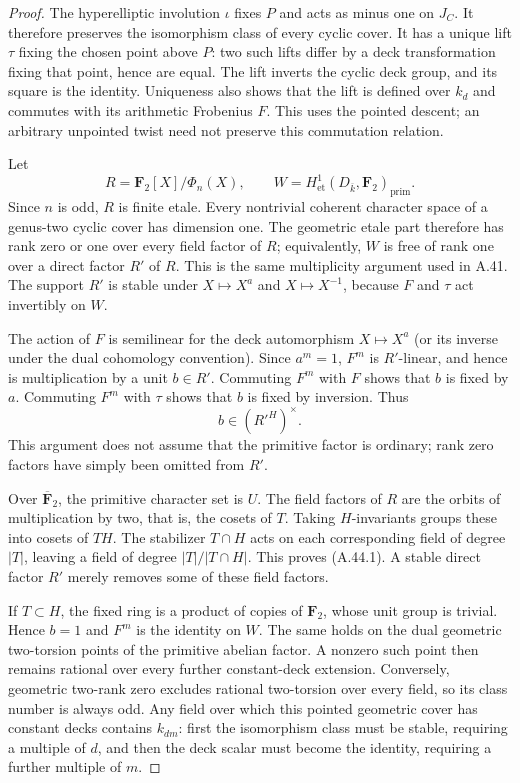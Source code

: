 \documentclass[11pt]{article}
\begin{document}
\begin{proof}
The hyperelliptic involution $\iota$ fixes $P$ and acts
as minus one on $J_C$. It therefore preserves the
isomorphism class of every cyclic cover. It has a
unique lift $\tau$ fixing the chosen point above $P$:
two such lifts differ by a deck transformation fixing
that point, hence are equal. The lift inverts the
cyclic deck group, and its square is the identity.
Uniqueness also shows that the lift is defined over
$k_d$ and commutes with its arithmetic Frobenius $F$.
This uses the pointed descent; an arbitrary unpointed
twist need not preserve this commutation relation.

Let
\[
 R=\mathbf F_2[X]/\Phi_n(X),\qquad
 W=H^1_{\mathrm{et}}(D_{\overline k},\mathbf F_2)_{\mathrm{prim}}.
\]
Since $n$ is odd, $R$ is finite etale. Every nontrivial
coherent character space of a genus-two cyclic cover
has dimension one. The geometric etale part therefore
has rank zero or one over every field factor of $R$;
equivalently, $W$ is free of rank one over a direct
factor $R'$ of $R$. This is the same multiplicity
argument used in A.41. The support $R'$ is stable
under $X\mapsto X^a$ and $X\mapsto X^{-1}$, because
$F$ and $\tau$ act invertibly on $W$.

The action of $F$ is semilinear for the deck
automorphism $X\mapsto X^a$ (or its inverse under the
dual cohomology convention). Since $a^m=1$, $F^m$ is
$R'$-linear, and hence is multiplication by a unit
$b\in R'$. Commuting $F^m$ with $F$ shows that
$b$ is fixed by $a$. Commuting $F^m$ with $\tau$
shows that $b$ is fixed by inversion. Thus
\[
                         b\in(R'^H)^\times.           \tag{A.44.3}
\]
This argument does not assume that the primitive
factor is ordinary; rank zero factors have simply
been omitted from $R'$.

Over $\overline{\mathbf F}_2$, the primitive character
set is $U$. The field factors of $R$ are the orbits
of multiplication by two, that is, the cosets of $T$.
Taking $H$-invariants groups these into cosets of $TH$.
The stabilizer $T\cap H$ acts on each corresponding
field of degree $|T|$, leaving a field of degree
$|T|/|T\cap H|$. This proves (A.44.1). A stable
direct factor $R'$ merely removes some of these
field factors.

If $T\subset H$, the fixed ring is a product of copies
of $\mathbf F_2$, whose unit group is trivial. Hence
$b=1$ and $F^m$ is the identity on $W$. The same holds
on the dual geometric two-torsion points of the
primitive abelian factor. A nonzero such point then
remains rational over every further constant-deck
extension. Conversely, geometric two-rank zero
excludes rational two-torsion over every field, so
its class number is always odd. Any field over which
this pointed geometric cover has constant decks
contains $k_{dm}$: first the isomorphism class must
be stable, requiring a multiple of $d$, and then
the deck scalar must become the identity, requiring
a further multiple of $m$.


\end{proof}
\end{document}

